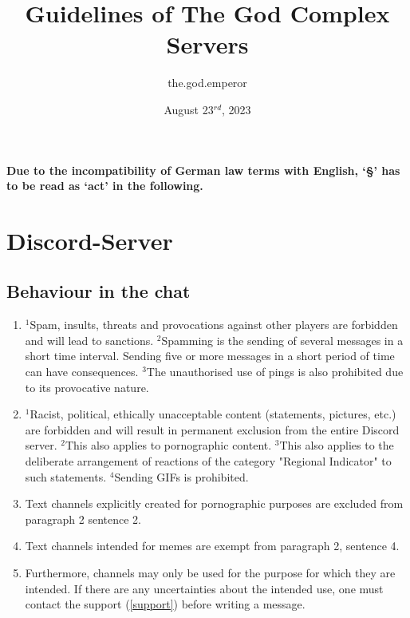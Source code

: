 \documentclass{article}
\title{Guidelines of The God Complex Servers}
\author{the.god.emperor}
\date{August 23$^{rd}$, 2023}
\begin{document}
\maketitle
\newpage
\tableofcontents
\newpage
\paragraph*{Due to the incompatibility of German law terms with English, `§' has to be read as `act' in the following.}

\section{Discord-Server}
\subsection{Behaviour in the chat}\label{verhalten}
\begin{enumerate}[(1)]
	\item $^{1}$Spam, insults, threats and provocations against other players are forbidden and will lead to sanctions. $^{2}$Spamming is the sending of several messages in a short time interval. Sending five or more messages in a short period of time can have consequences. $^{3}$The unauthorised use of pings is also prohibited due to its provocative nature.
	\item $^{1}$Racist, political, ethically unacceptable content (statements, pictures, etc.) are forbidden and will result in permanent exclusion from the entire Discord server. $^{2}$This also applies to pornographic content. $^{3}$This also applies to the deliberate arrangement of reactions of the category "Regional Indicator" to such statements. $^{4}$Sending GIFs is prohibited.
	\item Text channels explicitly created for pornographic purposes are excluded from paragraph 2 sentence 2.
	\item Text channels intended for memes are exempt from paragraph 2, sentence 4.
	\item Furthermore, channels may only be used for the purpose for which they are intended. If there are any uncertainties about the intended use, one must contact the support (\ref{support}) before writing a message.
\end{enumerate}
\end{document}
